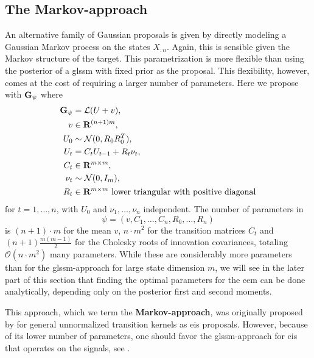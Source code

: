 \subsection{The Markov-approach}
\label{subsec:markov-approach}
An alternative family of Gaussian proposals is given by directly modeling a Gaussian Markov process on the states $X_{:n}$. Again, this is sensible given the Markov structure of the target. This parametrization is more flexible than using the posterior of a \gls{glssm} with fixed prior as the proposal. This flexibility, however, comes at the cost of requiring a larger number of parameters. Here we propose with $\mathbf G_{\psi}$ where
\begin{align}
    \begin{split}
    \label{eq:markov-proposal}
    \mathbf G_{\psi} &= \mathcal L (U + v), \\
    v &\in \mathbf R^{(n + 1)m}, \\
    U_{0} &\sim \mathcal N(0, R_{0}R_{0}^T),\\
    U_{t} &= C_{t}U_{t - 1} + R_{t}\nu_{t}, \\
    C_{t} &\in \mathbf R^{m\times m},\\
    \nu_{t} &\sim \mathcal N(0,I_{m}), \\
    R_{t}&\in\mathbf R^{m \times m} \text{ lower triangular with positive diagonal}
    \end{split}
\end{align}
for $t = 1, \dots, n$, with $U_{0}$ and $\nu_{1}, \dots, \nu_{n}$ independent. The number of parameters in $$\psi= \left( v, C_{1}, \dots, C_{n}, R_{0}, \dots, R_{n} \right)$$ is $(n + 1)\cdot m$ for the mean $v$, $n \cdot m^{2}$ for the transition matrices $C_{t}$ and $(n + 1) \frac{m (m - 1)}{2}$ for the Cholesky roots of innovation covariances, totaling $\mathcal O(n\cdot m^{2})$ many parameters. 
While these are considerably more parameters than for the \gls{glssm}-approach for large state dimension $m$, we will see in the later part of this section that finding the optimal parameters for the \gls{cem} can be done analytically, depending only on the posterior first and second moments. 

This approach, which we term the \textbf{Markov-approach}, was originally proposed by \citep{Richard2007Efficient} for general unnormalized transition kernels as \gls{eis} proposals. However, because of its lower number of parameters, one should favor the \gls{glssm}-approach for \gls{eis} that operates on the signals, see \citep{Koopman2019Modified}.


